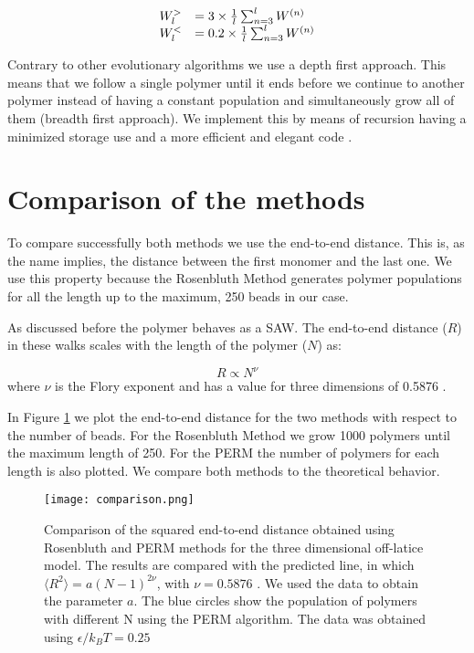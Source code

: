 \documentclass[aps,prl,reprint,groupedaddress]{revtex4-1}
\begin{document}
\begin{equation}
\begin{array}{l l}
	W_l^> &= 3 \times \frac{1}{l}\sum_{n=3}^l W^{(n)} \\
    W_l^< &= 0.2 \times \frac{1}{l}\sum_{n=3}^l W^{(n)}
\end{array}
\end{equation}

Contrary to other evolutionary algorithms we use a depth first approach. This means that we follow a single polymer until it ends before we continue to another polymer instead of having a constant population and simultaneously grow all of them (breadth first approach). We implement this by means of recursion having a minimized storage use and a more efficient and elegant code \cite{Grassberger1997}.

\section{Comparison of the methods}

To compare successfully both methods we use the end-to-end distance. This is, as the name implies, the distance between the first monomer and the last one. We use this property because the Rosenbluth Method generates polymer populations for all the length up to the maximum, 250 beads in our case. 

As discussed before the polymer behaves as a SAW. The end-to-end distance ($R$) in these walks scales with the length of the polymer ($N$) as:

\begin{equation}
	R \propto N^\nu
\end{equation}
where $\nu$ is the Flory exponent and has a value for three dimensions of 0.5876 \cite{Clisby2010}.

In Figure \ref{comparison} we plot the end-to-end distance for the two methods with respect to the number of beads. For the Rosenbluth Method we grow 1000 polymers until the maximum length of 250. For the PERM the number of polymers for each length is also plotted. We compare both methods to the theoretical behavior. 

\begin{figure}[tb]
	\texttt{[image: comparison.png]}
	\caption{Comparison of the squared end-to-end distance obtained using Rosenbluth and PERM methods for the three dimensional off-latice model. The results are compared with the predicted line, in which $\langle R^2 \rangle = a(N-1)^{2 \nu}$, with $\nu = 0.5876$ \cite{Clisby2010}. We used the data to obtain the parameter $a$. The blue circles show the population of polymers with different N using the PERM algorithm. The data was obtained using $\epsilon/k_B T = 0.25$\label{comparison}}
\end{figure}
\end{document}
